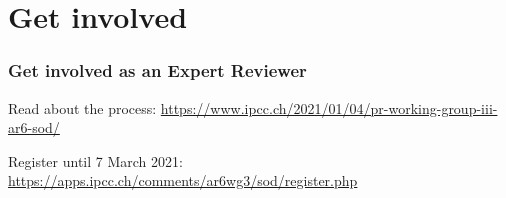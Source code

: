 \documentclass[12pt,aspectratio=169]{beamer}
\begin{document}
\section{Get involved}

\begin{frame}
\frametitle{Get involved as an Expert Reviewer}

Read about the process: \url{https://www.ipcc.ch/2021/01/04/pr-working-group-iii-ar6-sod/}

\bigskip
Register until \alert{7 March 2021}: \url{https://apps.ipcc.ch/comments/ar6wg3/sod/register.php}

\bigskip
\bigskip
\hfill {}
\end{frame}
\end{document}

